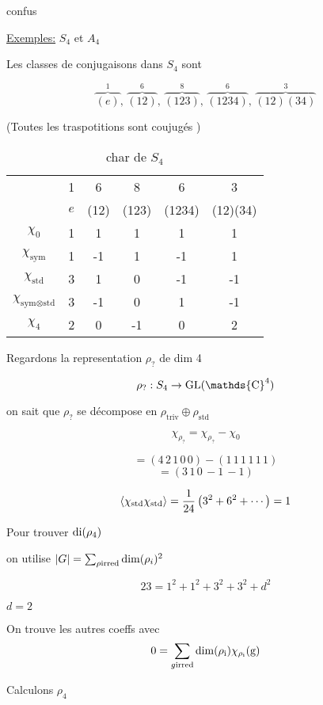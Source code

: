 confus

\underline{Exemples:} $S_4 $ et $A_4 $

Les classes de conjugaisons dans $S_4 $ sont 

\[ \overbrace{(e)}^{1} ,\, \overbrace{(12)}^{6} ,\, \overbrace{(123)}^{8} ,\, \overbrace{(1234)}^{6} ,\, \overbrace{(12)(34)}^{3}     \]

(Toutes les traspotitions sont coujugés )


\begin{table}[htpb]
	\centering
	\label{tab:label}
	\begin{tabular}{c|c|c|c|c|c}
		 & 1  & 6 & 8 & 6 & 3\\
		 & $e$ & (12) & (123) & (1234) & (12)(34)\\\hline
		$\chi_0$ & 1 & 1 & 1 & 1 & 1 \\\hline 
		$\chi_{\text{sym}}$ &1 & -1 & 1 & -1 & 1 \\\hline
		$\chi_{\text{std}}$ &3 & 1 & 0 & -1 & -1 \\\hline
		$\chi_{\text{sym} \otimes \text{std} }$ &3 & -1 & 0 & 1 & -1 \\\hline
		$\chi_{4}$ &2 & 0 & -1 & 0 & 2 \\\hline
	\end{tabular}
	\caption{char de $S_4$}
\end{table}



Regardons la representation  $\rho_?$ de dim 4

\[ \rho_? : S_4 \to \rm{GL}(\mathds{C}^{4}) \]

on sait que $\rho_?$ se décompose en $\rho_{\text{triv}} \oplus \rho_{\text{std}} $


\[ \chi_{\rho_{?}} = \chi_{\rho_{?}} - \chi_0   \]

\[ = (4\, 2\, 1\, 0\, 0) - (1\,1 \, 1\, 1\,1 \,1) \]
\[  = (3\, 1\, 0 \, -1\, -1) \]

\[ \expval{\chi_{\text{std}} \chi_{\text{std}}  } = \frac{1}{24} \left( 3^2 + 6^2 + \dotsb \right)  =1  \]


Pour trouver $\rm{di}(\rho_4 )$

on utilise $\abs{G} = \sum_{\rho \text{irred} }\dim(\rho_i)^2$

\[ 23 = 1^2 + 1 ^2 + 3^2 + 3^2 +d^{2} \]

$d = 2$

On trouve les autres coeffs avec \[ 0 = \sum_{g \text{irred} } \rm{dim} (\rho_i) \chi_{\rho_i} (g) \]

Calculons $\rho_4$

